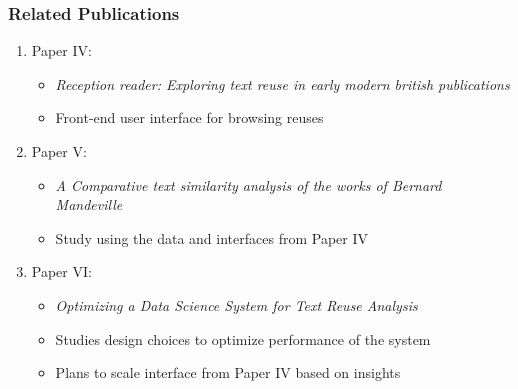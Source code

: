 \documentclass[pdf]{beamer}
\begin{document}
\begin{frame}
    \frametitle{Related Publications}

    \begin{enumerate}
        \item Paper IV: \citet{Rosson-2023}
        \begin{itemize}
            \item \emph{Reception reader: Exploring text reuse in early modern british publications}
            \item Front-end user interface for browsing reuses
        \end{itemize}
        \item Paper V: \citet{des6}
        \begin{itemize}
            \item \emph{A Comparative text similarity analysis of the works of Bernard Mandeville}
            \item Study using the data and interfaces from Paper IV
        \end{itemize}
        \item Paper VI: \citet{mahadevan2024optimizing}
        \begin{itemize}
            \item \emph{Optimizing a Data Science System for Text Reuse Analysis}
            \item Studies design choices to optimize performance of the system
            \item Plans to scale interface from Paper IV based on insights
        \end{itemize}
    \end{enumerate}


\end{frame}
\end{document}
